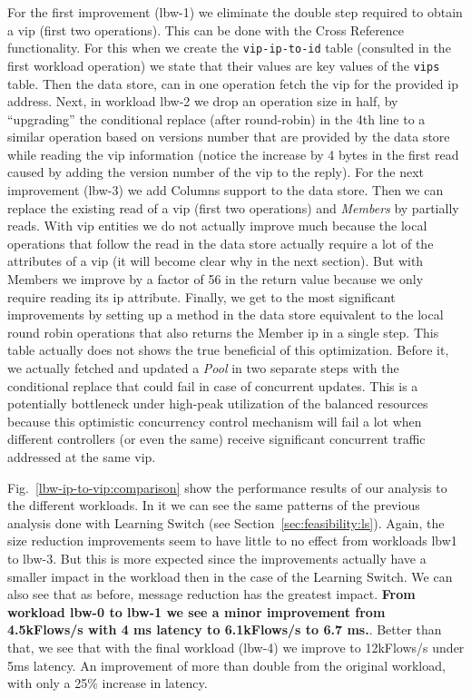 For the first improvement (lbw-1) we eliminate the double step required to obtain a \gls{vip} (first two operations). 
This can be done with the Cross Reference functionality. For this when we create  the \texttt{vip-ip-to-id} table (consulted in the first workload operation)  we state that their values are key values of the \texttt{vips} table. Then the data store, can  in one operation  fetch the \gls{vip} for the provided \gls{ip} address. 
Next, in workload lbw-2 we drop an operation size in half, by ``upgrading'' the conditional replace (after round-robin) in the 4th line to a similar operation based on  versions number that are  provided by the data store while reading the \gls{vip} information (notice the increase by 4 bytes in the first read caused by adding the version number of the \gls{vip} to the reply).  
For the next improvement (lbw-3) we add Columns support to the data store. 
Then we can replace the existing read of a \gls{vip} (first two operations) and \emph{Members} by partially reads. 
With \gls{vip} entities we do not actually improve much because the local operations that follow the read in the
data store actually require a lot of the attributes of a \gls{vip} (it will become clear why in the next section). 
But with Members we improve by a factor of 56 in the return value because we only require reading its \gls{ip} attribute. 
Finally, we get to the most significant improvements by setting up a method in the data store equivalent to the local round robin operations that also returns the Member \gls{ip} in a single step.
This table actually does not shows the true beneficial of this optimization. 
Before it, we actually fetched and updated a \emph{Pool} in two separate steps with the conditional replace that could fail in case of concurrent updates. 
This is a potentially bottleneck under high-peak utilization of the balanced resources because this optimistic concurrency control mechanism will fail a lot when different controllers (or even the same) receive significant concurrent traffic addressed at the same \gls{vip}.  






Fig.~\ref{lbw-ip-to-vip:comparison} show the performance results of our analysis to the different workloads. 
In it  we can see the same patterns of the previous analysis done with Learning Switch (see Section~\ref{sec:feasibility:ls}).
Again, the size reduction improvements seem to have little to no effect from workloads lbw1 to lbw-3. 
But this is more expected since the improvements actually have a smaller impact in the workload then in the case of the Learning Switch. We can also see that as before, message reduction has the greatest impact. 
\textbf{From workload lbw-0 to lbw-1 we see a minor improvement from 4.5kFlows/s with 4 ms latency to 6.1kFlows/s to 6.7 ms.}. 
Better than that, we see that with the final workload (lbw-4) we improve to 12kFlows/s  under 5ms latency. 
An improvement of more than double from the original workload, with only a 25\% increase in latency. 

